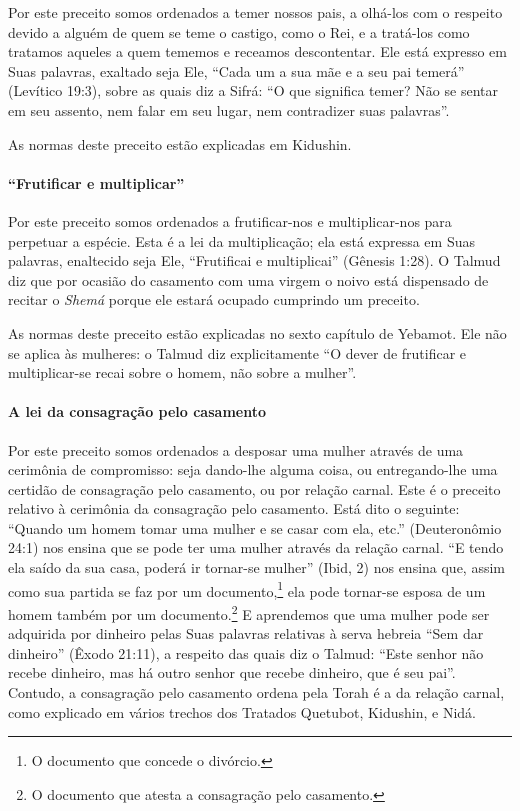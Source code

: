 Por este preceito somos ordenados a temer nossos pais, a olhá-los com o
respeito devido a alguém de quem se teme o castigo, como o Rei, e a
tratá-los como tratamos aqueles a quem tememos e receamos descontentar.
Ele está expresso em Suas palavras, exaltado seja Ele, ``Cada um a sua
mãe e a seu pai temerá'' (Levítico 19:3), sobre as quais diz a Sifrá:
``O que significa temer? Não se sentar em seu assento, nem falar em seu
lugar, nem contradizer suas palavras''.

As normas deste preceito estão explicadas em Kidushin.

\paragraph{``Frutificar e multiplicar''}

Por este preceito somos ordenados a frutificar-nos e multiplicar-nos
para perpetuar a espécie. Esta é a lei da multiplicação; ela está
expressa em Suas palavras, enaltecido seja Ele, ``Frutificai e
multiplicai'' (Gênesis 1:28). O Talmud diz que por ocasião do casamento
com uma virgem o noivo está dispensado de recitar o \textit{Shemá} porque ele
estará ocupado cumprindo um preceito.

As normas deste preceito estão explicadas no sexto capítulo de Yebamot.
Ele não se aplica às mulheres: o Talmud diz explicitamente ``O dever de
frutificar e multiplicar-se recai sobre o homem, não sobre a mulher''.

\paragraph{A lei da consagração pelo casamento}

Por este preceito somos ordenados a desposar uma mulher através de uma
cerimônia de compromisso: seja dando-lhe alguma coisa, ou entregando-lhe
uma certidão de consagração pelo casamento, ou por relação carnal. Este
é o preceito relativo à cerimônia da consagração pelo casamento. Está
dito o seguinte: ``Quando um homem tomar uma mulher e se casar com ela,
etc.'' (Deuteronômio 24:1) nos ensina que se pode ter uma mulher através da relação
carnal. ``E tendo ela saído da sua casa, poderá ir tornar-se mulher''
(Ibid, 2) nos ensina que, assim como sua partida se faz por um
documento,\footnote{O documento que concede o divórcio.} ela pode tornar-se esposa de um homem
também por um documento.\footnote{O documento que atesta a consagração pelo casamento.} E aprendemos que uma
mulher pode ser adquirida por dinheiro pelas Suas palavras relativas à
serva hebreia ``Sem dar dinheiro'' (Êxodo 21:11), a respeito das quais
diz o Talmud: ``Este senhor não recebe dinheiro, mas há outro senhor que
recebe dinheiro, que é seu pai''. Contudo, a consagração pelo casamento
ordena pela Torah é a da relação carnal, como explicado em vários
trechos dos Tratados Quetubot, Kidushin, e Nidá.

